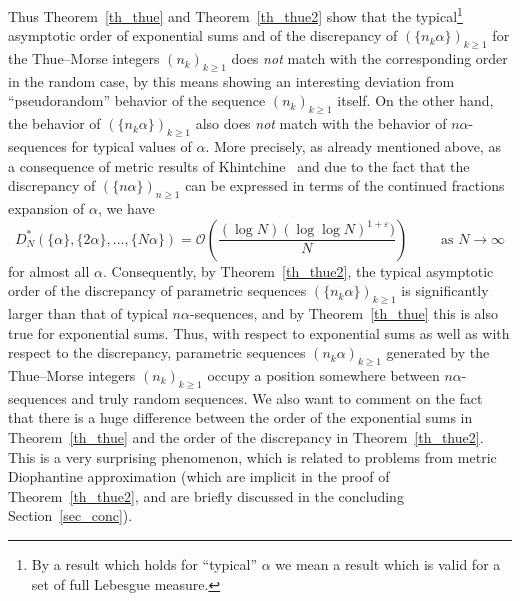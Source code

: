 \documentclass[12pt]{amsart}
\newcommand {\ve} {\varepsilon}
\begin{document}
Thus Theorem~\ref{th_thue} and Theorem~\ref{th_thue2} show that the typical\footnote{By a result which holds for ``typical'' $\alpha$ we mean a result which is valid for a set of full Lebesgue measure.} asymptotic order of exponential sums and of the discrepancy of $(\{n_k \alpha\})_{k \geq 1}$ for the Thue--Morse integers $(n_k)_{k \geq 1}$ does \emph{not} match with the corresponding order in the random case, by this means showing an interesting deviation from ``pseudorandom'' behavior of the sequence $(n_k)_{k \geq 1}$ itself. On the other hand, the behavior of $(\{n_k \alpha\})_{k \geq 1}$ also does \emph{not} match with the behavior of $n \alpha$-sequences for typical values of $\alpha$. More precisely, as already mentioned above, as a consequence of metric results of Khintchine~\cite{khin} and due to the fact that the discrepancy of $(\{n \alpha\})_{n \geq 1}$ can be expressed in terms of the continued fractions expansion of $\alpha$, we have
\begin{equation} \label{khin}
D_N^*( \{\alpha\}, \{2 \alpha\}, \dots, \{N \alpha\}) = \mathcal{O} \left( \frac{(\log N) (\log \log N)^{1+\ve})}{N} \right) \qquad \textrm{ as $N \to \infty$}
\end{equation}
for almost all $\alpha$. Consequently, by Theorem~\ref{th_thue2}, the typical asymptotic order of the discrepancy of parametric sequences $(\{n_k \alpha\})_{k \geq 1}$ is significantly larger than that of typical $n \alpha$-sequences, and by Theorem~\ref{th_thue} this is also true for exponential sums. Thus, with respect to exponential sums as well as with respect to the discrepancy, parametric sequences $(n_k \alpha)_{k \geq 1}$ generated by the Thue--Morse integers $(n_k)_{k \geq 1}$ occupy a position somewhere between $n \alpha$-sequences and truly random sequences. We also want to comment on the fact that there is a huge difference between the order of the exponential sums in Theorem~\ref{th_thue} and the order of the discrepancy in Theorem~\ref{th_thue2}. This is a very surprising phenomenon, which is related to problems from metric Diophantine approximation (which are implicit in the proof of Theorem~\ref{th_thue2}, and are briefly discussed in the concluding Section~\ref{sec_conc}).\\
\end{document}
